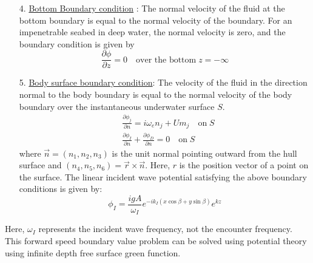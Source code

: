 \begin{itemize}
    \item[4.] \underline{Bottom Boundary condition} :
    The normal velocity of the fluid at the bottom boundary is equal to the normal velocity of the boundary. For an impenetrable seabed in deep water, the normal velocity is zero, and the boundary condition is given by 
    \begin{equation}
        \frac{\partial \phi}{\partial z} = 0 \quad \text{over the bottom}\; z = -\infty
    \end{equation}
    \item[5.] \underline{Body surface boundary condition}:
    The velocity of the fluid in the direction normal to the body boundary is equal to the normal velocity of the body boundary over the instantaneous underwater surface $S$.
    \begin{align}
        \label{eq:body_surface_boundary_cond}
        &\frac{\partial \phi_j}{\partial n} = i\omega_e n_j + Um_j \quad \text{on}\; S \\
        &\frac{\partial \phi_I}{\partial n} + \frac{\partial \phi_D}{\partial n} = 0 \quad \text{on}\; S
    \end{align}
    where $\vec{n} = (n_1, n_2, n_3)$ is the unit normal pointing outward from the hull surface and $(n_4, n_5, n_6)=\vec{r}\times \vec{n}$. Here, $r$ is the position vector of a point on the surface.
    The linear incident wave potential satisfying the above boundary conditions is given by:
    \begin{equation}
        \phi_I = \frac{igA}{\omega_I} e^{-ik_I(x\cos \beta + y\sin \beta)}e^{kz}
    \end{equation}
\end{itemize}

 Here, $\omega_I$ represents the incident wave frequency, not the encounter frequency.
This forward speed boundary value problem can be solved using potential theory using infinite depth free surface green function. 

